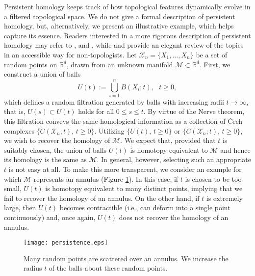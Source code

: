 \documentclass[11pt]{amsart}
\numberwithin{equation}{section}
\theoremstyle{plain}
\theoremstyle{definition}
\begin{document}
 Persistent homology keeps track of how topological features dynamically evolve in a filtered topological space. We do not give a formal description of persistent homology, but, alternatively, we present an illustrative example, which helps capture its essence. Readers interested in a more rigorous description of persistent homology may refer to \cite{edelsbrunner:letscher:zomorodian:2002}, \cite{zomorodian:carlsson:2005} and \cite{edelsbrunner:harer:2010}, while \cite{adler:bobrowski:borman:subag:weinberger:2010} and \cite{ghrist:2008} provide an elegant review of the topics in an accessible way for non-topologists. Let $\mathcal X_n = \{ X_1,\dots,X_n \}$ be a set of random points on ${{\mathbb R}}^d$, drawn from an unknown manifold $\mathcal M \subset {{\mathbb R}}^d$. First, we construct a union of balls
$$
U(t) := \bigcup_{i=1}^n B(X_i; t), \ \ \ t\geq0,
$$
which defines a random filtration generated by balls with increasing radii $t\to \infty$, that is, $U(s) \subset U(t)$ holds for all $0 \leq s \leq t$. By virtue of the Nerve theorem, this filtration conveys the same homological information as a collection of \v{C}ech complexes $\bigl\{  \check{C} (\mathcal X_n; t), \,  t\geq0 \bigr\}$. Utilizing $\bigl\{ U(t), \, t\geq0  \bigr\}$ or $\bigl\{  \check{C} (\mathcal X_n; t), \,  t\geq0 \bigr\}$, we wish to recover the homology of $\mathcal M$. We expect that, provided that $t$ is suitably chosen, the union of balls $U(t)$ is homotopy equivalent to $\mathcal M$ and hence its homology is the same as $\mathcal M$. In general, however, selecting such an appropriate $t$ is not easy at all. To make this more transparent, we consider an example for which $\mathcal M$ represents an annulus (Figure \ref{f:persistence}). In this case, if $t$ is chosen to be too small, $U(t)$ is homotopy equivalent to many distinct points, implying that we fail to recover the homology of an annulus. On the other hand, if $t$ is extremely large, then $U(t)$ becomes contractible (i.e., can deform into a single point continuously) and, once again, $U(t)$ does not recover the homology of an annulus.
\begin{figure}[!t]
\begin{center}
\texttt{[image: persistence.eps]}
\caption{{\footnotesize Many random points are scattered over an annulus. We increase the radius $t$ of the balls about these random points. }}
\label{f:persistence}
\end{center}
\end{figure}
\end{document}
